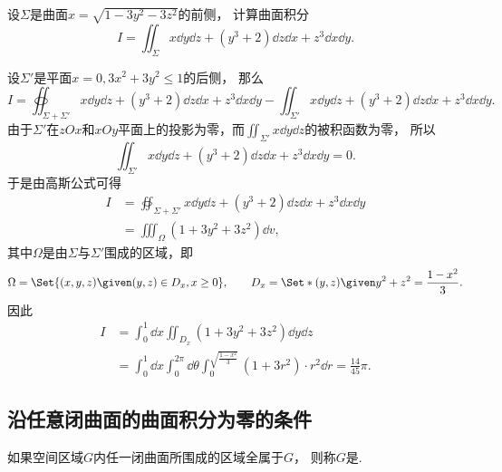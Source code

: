 \begin{example}
设\(\Sigma\)是曲面\(x = \sqrt{1-3y^2-3z^2}\)的前侧，
计算曲面积分\begin{equation*}
	I = \iint_\Sigma x \dd{y}\dd{z} + (y^3+2) \dd{z}\dd{x} + z^3 \dd{x}\dd{y}.
\end{equation*}
\begin{solution}
设\(\Sigma'\)是平面\(x=0,3x^2+3y^2\leq1\)的后侧，
那么\begin{equation*}
	I = \oiint_{\Sigma + \Sigma'} x \dd{y}\dd{z} + (y^3+2) \dd{z}\dd{x} + z^3 \dd{x}\dd{y}
	- \iint_{\Sigma'} x \dd{y}\dd{z} + (y^3+2) \dd{z}\dd{x} + z^3 \dd{x}\dd{y}.
\end{equation*}
由于\(\Sigma'\)在\(zOx\)和\(xOy\)平面上的投影为零，而\(\iint_{\Sigma'} x \dd{y}\dd{z}\)的被积函数为零，
所以\begin{equation*}
	\iint_{\Sigma'} x \dd{y}\dd{z} + (y^3+2) \dd{z}\dd{x} + z^3 \dd{x}\dd{y} = 0.
\end{equation*}
于是由高斯公式可得\begin{align*}
	I &= \oiint_{\Sigma + \Sigma'} x \dd{y}\dd{z} + (y^3+2) \dd{z}\dd{x} + z^3 \dd{x}\dd{y} \\
	&= \iiint_\Omega (1+3y^2+3z^2) \dd{v},
\end{align*}
其中\(\Omega\)是由\(\Sigma\)与\(\Sigma'\)围成的区域，即\begin{equation*}
	\Omega = \Set{ (x,y,z) \given (y,z) \in D_x, x\geq0 },
	\qquad
	D_x = \Set*{ (y,z) \given y^2+z^2 = \frac{1-x^2}3 }.
\end{equation*}
因此\begin{align*}
	I &= \int_0^1 \dd{x} \iint_{D_x} (1+3y^2+3z^2) \dd{y}\dd{z} \\
	&= \int_0^1 \dd{x}
	\int_0^{2\pi} \dd{\theta}
	\int_0^{\sqrt{\frac{1-x^2}3}} (1+3r^2) \cdot r^2 \dd{r}
	= \frac{14}{45} \pi.
\end{align*}
\end{solution}
\end{example}

\subsection{沿任意闭曲面的曲面积分为零的条件}
\begin{definition}
如果空间区域\(G\)内任一闭曲面所围成的区域全属于\(G\)，
则称\(G\)是.
\end{definition}

